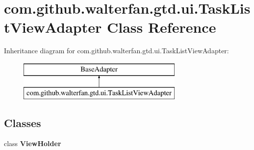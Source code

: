 \hypertarget{classcom_1_1github_1_1walterfan_1_1gtd_1_1ui_1_1TaskListViewAdapter}{\section{com.\-github.\-walterfan.\-gtd.\-ui.\-Task\-List\-View\-Adapter Class Reference}
\label{classcom_1_1github_1_1walterfan_1_1gtd_1_1ui_1_1TaskListViewAdapter}
}
Inheritance diagram for com.\-github.\-walterfan.\-gtd.\-ui.\-Task\-List\-View\-Adapter\-:\begin{figure}[H]
\begin{center}
\leavevmode
\includegraphics[height=2.000000cm]{classcom_1_1github_1_1walterfan_1_1gtd_1_1ui_1_1TaskListViewAdapter}
\end{center}
\end{figure}
\subsection*{Classes}
\begin{DoxyCompactItemize}
\item 
class {\bfseries View\-Holder}
\end{DoxyCompactItemize}
